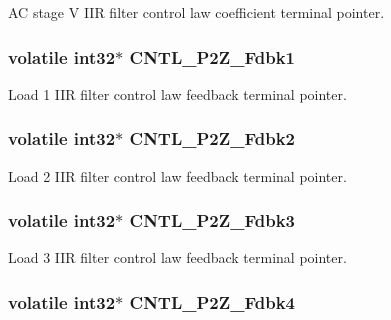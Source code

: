 A\-C stage V I\-I\-R filter control law coefficient terminal pointer. \hypertarget{a00014_a9c0418a780375035750c3d4dc16f3ae4}{
\subsubsection[{C\-N\-T\-L\-\_\-2\-P2\-Z\-\_\-\-Fdbk1}]{\setlength{\rightskip}{0pt plus 5cm}volatile int32$\ast$ C\-N\-T\-L\-\_\-P2\-Z\-\_\-\-Fdbk1}}\label{a00014_a9c0418a780375035750c3d4dc16f3ae4}
Load 1 I\-I\-R filter control law feedback terminal pointer. \hypertarget{a00014_a6092ef1c1c54802bb5e11564f782390d}{
\subsubsection[{C\-N\-T\-L\-\_\-2\-P2\-Z\-\_\-\-Fdbk2}]{\setlength{\rightskip}{0pt plus 5cm}volatile int32$\ast$ C\-N\-T\-L\-\_\-P2\-Z\-\_\-\-Fdbk2}}\label{a00014_a6092ef1c1c54802bb5e11564f782390d}
Load 2 I\-I\-R filter control law feedback terminal pointer. \hypertarget{a00014_a939782d23ddbf7f45e5e393a65bafcff}{
\subsubsection[{C\-N\-T\-L\-\_\-2\-P2\-Z\-\_\-\-Fdbk3}]{\setlength{\rightskip}{0pt plus 5cm}volatile int32$\ast$ C\-N\-T\-L\-\_\-P2\-Z\-\_\-\-Fdbk3}}\label{a00014_a939782d23ddbf7f45e5e393a65bafcff}
Load 3 I\-I\-R filter control law feedback terminal pointer. \hypertarget{a00014_a6937e965f3ae840ea6ee43cce410680f}{
\subsubsection[{C\-N\-T\-L\-\_\-2\-P2\-Z\-\_\-\-Fdbk4}]{\setlength{\rightskip}{0pt plus 5cm}volatile int32$\ast$ C\-N\-T\-L\-\_\-P2\-Z\-\_\-\-Fdbk4}}\label{a00014_a6937e965f3ae840ea6ee43cce410680f}
